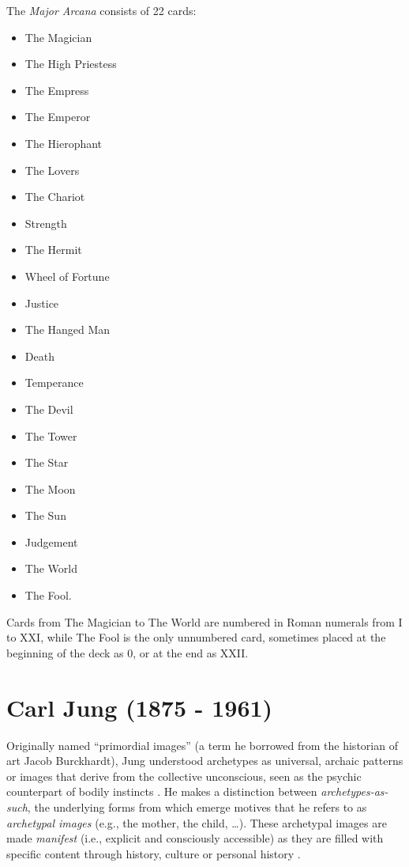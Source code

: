 \documentclass[]{book}
\providecommand{\tightlist}{%
  \setlength{\itemsep}{0pt}\setlength{\parskip}{0pt}}
\begin{document}
The \emph{Major Arcana} consists of 22 cards:

\begin{itemize}
\tightlist
\item
  The Magician
\item
  The High Priestess
\item
  The Empress
\item
  The Emperor
\item
  The Hierophant
\item
  The Lovers
\item
  The Chariot
\item
  Strength
\item
  The Hermit
\item
  Wheel of Fortune
\item
  Justice
\item
  The Hanged Man
\item
  Death
\item
  Temperance
\item
  The Devil
\item
  The Tower
\item
  The Star
\item
  The Moon
\item
  The Sun
\item
  Judgement
\item
  The World
\item
  The Fool.
\end{itemize}

Cards from The Magician to The World are numbered in Roman numerals from I to XXI, while The Fool is the only unnumbered card, sometimes placed at the beginning of the deck as 0, or at the end as XXII.

\hypertarget{carl-jung-1875---1961}{%
\section{Carl Jung (1875 - 1961)}\label{carl-jung-1875---1961}}

Originally named ``primordial images'' (a term he borrowed from the historian of art Jacob Burckhardt), Jung understood archetypes as universal, archaic patterns or images that derive from the collective unconscious, seen as the psychic counterpart of bodily instincts \citep{feist2009theories}. He makes a distinction between \emph{archetypes-as-such}, the underlying forms from which emerge motives that he refers to as \emph{archetypal images} (e.g., the mother, the child, \ldots). These archetypal images are made \emph{manifest} (i.e., explicit and consciously accessible) as they are filled with specific content through history, culture or personal history \citep{papadopoulos2012}.
\end{document}
